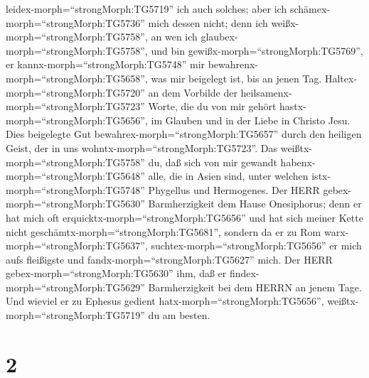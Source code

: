 leidex-morph=``strongMorph:TG5719'' ich auch solches; aber ich
schämex-morph=``strongMorph:TG5736'' mich dessen nicht; denn ich
weißx-morph=``strongMorph:TG5758'', an wen ich
glaubex-morph=``strongMorph:TG5758'', und bin
gewißx-morph=``strongMorph:TG5769'', er
kannx-morph=``strongMorph:TG5748'' mir
bewahrenx-morph=``strongMorph:TG5658'', was mir beigelegt ist, bis an
jenen Tag.  Haltex-morph=``strongMorph:TG5720'' an dem
Vorbilde der heilsamenx-morph=``strongMorph:TG5723'' Worte, die du von
mir gehört hastx-morph=``strongMorph:TG5656'', im Glauben und in der
Liebe in Christo Jesu.  Dies beigelegte Gut
bewahrex-morph=``strongMorph:TG5657'' durch den heiligen Geist, der in
uns wohntx-morph=``strongMorph:TG5723''.  Das
weißtx-morph=``strongMorph:TG5758'' du, daß sich von mir gewandt
habenx-morph=``strongMorph:TG5648'' alle, die in Asien sind, unter
welchen istx-morph=``strongMorph:TG5748'' Phygellus und Hermogenes.
 Der HERR gebex-morph=``strongMorph:TG5630'' Barmherzigkeit
dem Hause Onesiphorus; denn er hat mich oft
erquicktx-morph=``strongMorph:TG5656'' und hat sich meiner Kette nicht
geschämtx-morph=``strongMorph:TG5681'',  sondern da er zu
Rom warx-morph=``strongMorph:TG5637'',
suchtex-morph=``strongMorph:TG5656'' er mich aufs fleißigste und
fandx-morph=``strongMorph:TG5627'' mich.  Der HERR
gebex-morph=``strongMorph:TG5630'' ihm, daß er
findex-morph=``strongMorph:TG5629'' Barmherzigkeit bei dem HERRN an
jenem Tage. Und wieviel er zu Ephesus gedient
hatx-morph=``strongMorph:TG5656'', weißtx-morph=``strongMorph:TG5719''
du am besten.

\hypertarget{section-1}{%
\section{2}\label{section-1}}

